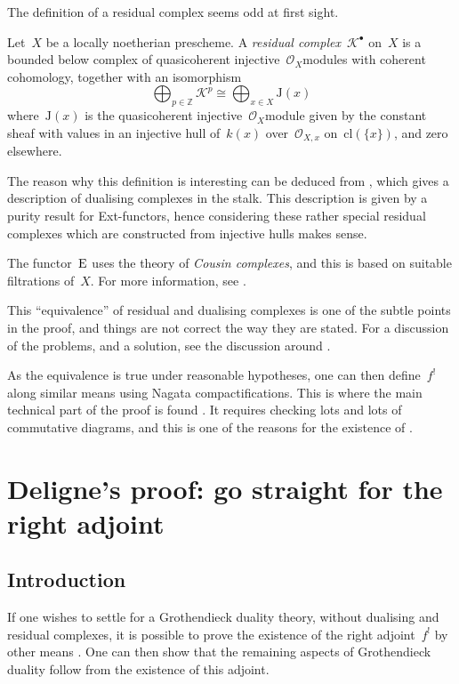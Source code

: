 The definition of a residual complex seems odd at first sight.
\begin{definition}
  Let~$X$ be a locally noetherian prescheme. A \emph{residual complex}~$\mathcal{K}^\bullet$ on~$X$ is a bounded below complex of quasicoherent injective~$\mathcal{O}_X$\dash modules with coherent cohomology, together with an isomorphism
  \begin{equation}
    \bigoplus_{p\in\mathbb{Z}}\mathcal{K}^p\cong\bigoplus_{x\in X}\mathrm{J}(x)
  \end{equation}
  where~$\mathrm{J}(x)$ is the quasicoherent injective~$\mathcal{O}_X$\dash module given by the constant sheaf with values in an injective hull of~$k(x)$ over~$\mathcal{O}_{X,x}$ on~$\mathrm{cl}(\{x\})$, and zero elsewhere.
\end{definition}
The reason why this definition is interesting can be deduced from \cite[proposition V.3.4]{hartshorne-residues-and-duality}, which gives a description of dualising complexes in the stalk. This description is given by a purity result for Ext-functors, hence considering these rather special residual complexes which are constructed from injective hulls makes sense.

The functor~$\operatorname{E}$ uses the theory of \emph{Cousin complexes}, and this is based on suitable filtrations of~$X$. For more information, see \cite[chapter IV]{hartshorne-residues-and-duality}.

This ``equivalence'' of residual and dualising complexes is one of the subtle points in the proof, and things are not correct the way they are stated. For a discussion of the problems, and a solution, see the discussion around \cite[lemma 3.2.1]{conrad-grothendieck-duality-and-base-change}.

As the equivalence is true under reasonable hypotheses, one can then define~$f^!$ along similar means using Nagata compactifications. This is where the main technical part of the proof is found \cite[\S VI.2--VI.5]{hartshorne-residues-and-duality}. It requires checking lots and lots of commutative diagrams, and this is one of the reasons for the existence of \cite{conrad-grothendieck-duality-and-base-change}.


\section{Deligne's proof: go straight for the right adjoint}
\label{section:deligne}
\subsection{Introduction}
If one wishes to settle for a Grothendieck duality theory, without dualising and residual complexes, it is possible to prove the existence of the right adjoint~$f^!$ by other means \cite{deligne-appendix-f-upper-shriek,verdier-base-change-twisted-inverse-image}. One can then show that the remaining aspects of Grothendieck duality follow from the existence of this adjoint.

